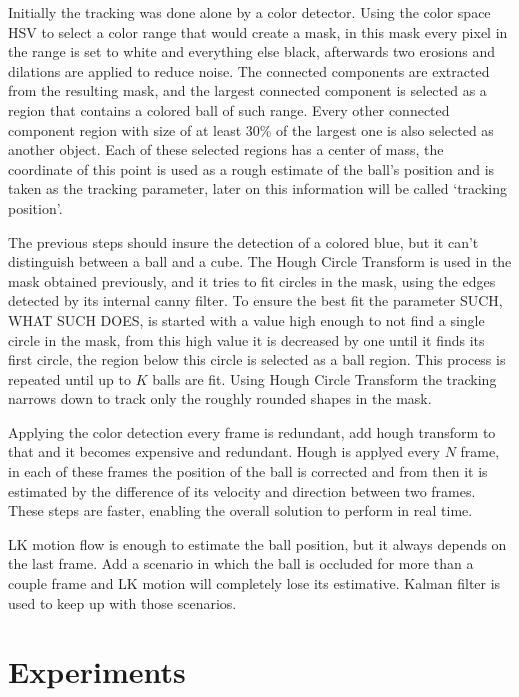 \documentclass[10pt,twocolumn,letterpaper]{article}
\begin{document}
  Initially the tracking was done alone by a color detector. Using the color
  space HSV to select a color range that would create a mask, in this mask every
  pixel in the range is set to white and everything else black, afterwards two
  erosions and dilations are applied to reduce noise. The connected components
  are extracted from the resulting mask, and the largest connected component is
  selected as a region that contains a colored ball of such range. Every other
  connected component region with size of at least 30\% of the largest one is
  also selected as another object. Each of these selected regions has a center
  of mass, the coordinate of this point is used as a rough estimate of
  the ball's position and is taken as the tracking parameter, later on this
  information will be called `tracking position'.

  The previous steps should insure the detection of a colored blue, but it can't
  distinguish between a ball and a cube. The Hough Circle Transform is used in
  the mask obtained previously, and it tries to fit circles in the mask, using
  the edges detected by its internal canny filter. To ensure the best fit the
  parameter SUCH, WHAT SUCH DOES, is started with a value high enough to not
  find a single circle in the mask, from this high value it is decreased by one
  until it finds its first circle, the region below this circle is selected as a
  ball region. This process is repeated until up to $K$ balls are fit. Using
  Hough Circle Transform the tracking narrows down to track only the roughly
  rounded shapes in the mask.

  Applying the color detection every frame is redundant, add hough transform to
  that and it becomes expensive and redundant. Hough is applyed every $N$ frame,
  in each of these frames the position of the ball is corrected and from then it
  is estimated by the difference of its velocity and direction between two
  frames. These steps are faster, enabling the overall solution to perform in
  real time.

  LK motion flow is enough to estimate the ball position, but it always depends
  on the last frame. Add a scenario in which the ball is occluded for more than
  a couple frame and LK motion will completely lose its estimative. Kalman
  filter is used to keep up with those scenarios.

\section{Experiments}
\end{document}
